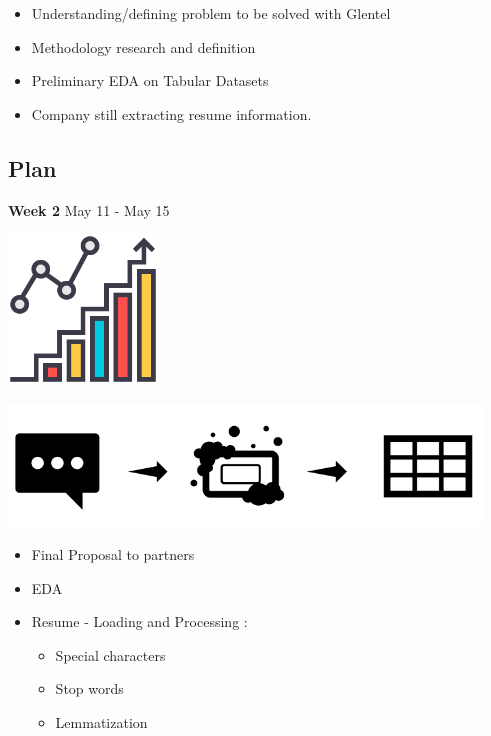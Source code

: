 \documentclass[
]{article}
\providecommand{\tightlist}{%
  \setlength{\itemsep}{0pt}\setlength{\parskip}{0pt}}
\begin{document}
\begin{itemize}
\tightlist
\item
  Understanding/defining problem to be solved with Glentel
\item
  Methodology research and definition
\item
  Preliminary EDA on Tabular Datasets
\end{itemize}

\begin{itemize}
\tightlist
\item
  Company still extracting resume information.
\end{itemize}

\hypertarget{plan-1}{%
\subsection{Plan}\label{plan-1}}

\textbf{Week 2} May 11 - May 15

\includegraphics[width=1.5625in,height=\textheight]{../img/project_proposal/17_eda.png}

\includegraphics[width=4.94792in,height=\textheight]{../img/project_proposal/16_week2.png}

\begin{itemize}
\tightlist
\item
  Final Proposal to partners
\item
  EDA
\end{itemize}

\begin{itemize}
\tightlist
\item
  Resume - Loading and Processing :

  \begin{itemize}
  \tightlist
  \item
    Special characters
  \item
    Stop words
  \item
    Lemmatization
  \end{itemize}
\end{itemize}
\end{document}
